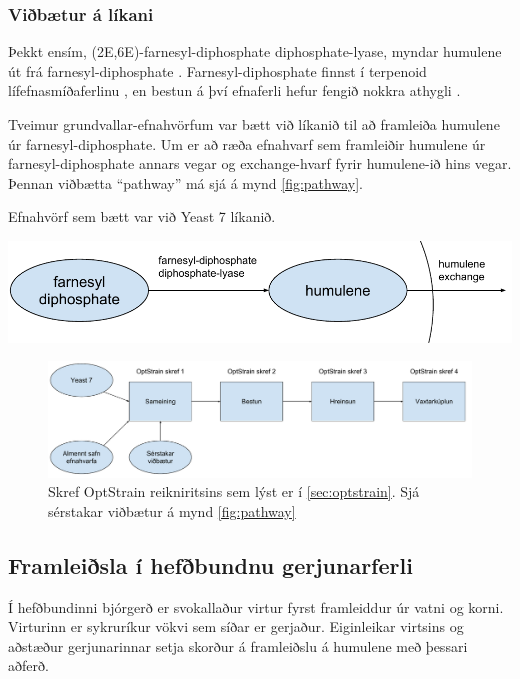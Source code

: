 \documentclass[11pt]{article}
\makeatletter
\newenvironment{figureonecolumn}{\begin{minipage}{\linewidth}\begin{center}\def\@captype{figure}}{\end{center}\end{minipage}}
\makeatother
\begin{document}
\begin{multicols}{2}
\subsubsection{Viðbætur á líkani}
Þekkt ensím, (2E,6E)-farnesyl-diphosphate diphosphate-lyase, myndar humulene út frá farnesyl-diphosphate \cite[KEGG: R08373]{Kanehisa01012000}. Farnesyl-diphosphate finnst í terpenoid lífefnasmíðaferlinu \cite[KEGG: rn00900]{Kanehisa01012000}, en bestun á því efnaferli hefur fengið nokkra athygli \cite{BIT:BIT21216,misawa2011pathway,asadollahi2008production}.

Tveimur grundvallar-efnahvörfum var bætt við líkanið til að framleiða humulene úr farnesyl-diphosphate.
Um er að ræða efnahvarf sem framleiðir humulene úr farnesyl-diphosphate annars vegar og exchange-hvarf fyrir humulene-ið hins vegar. Þennan viðbætta ``pathway'' má sjá á mynd \ref{fig:pathway}.

\begin{figureonecolumn}
\caption[Viðbætur við Yeast 7]{Efnahvörf sem bætt var við Yeast 7 líkanið.}
\label{fig:pathway}
\includegraphics[width=\linewidth]{Pics/HumuleneAddition}
\end{figureonecolumn}
\begin{figure}[b]
\caption[OptStrain reikniritið]{Skref OptStrain reikniritsins sem lýst er í \ref{sec:optstrain}. Sjá sérstakar viðbætur á mynd \ref{fig:pathway}}
\label{fig:flaedirit}
\includegraphics[width=\linewidth]{Pics/OptStrainOverview}
\end{figure}
\subsection{Framleiðsla í hefðbundnu gerjunarferli}
\label{sec:hefdbundid}
Í hefðbundinni bjórgerð er svokallaður virtur fyrst framleiddur úr vatni og korni. Virturinn er sykruríkur vökvi sem síðar er gerjaður. Eiginleikar virtsins og aðstæður gerjunarinnar setja skorður á framleiðslu á humulene með þessari aðferð.

\end{multicols}
\end{document}
